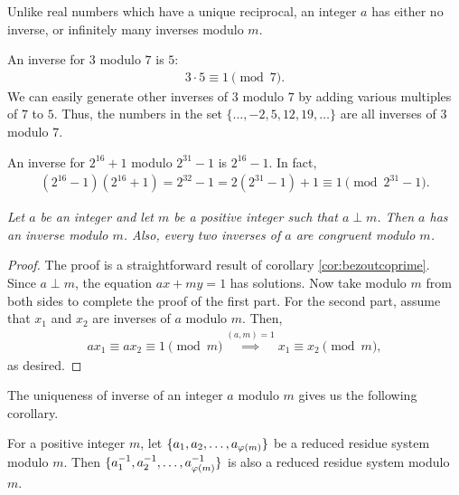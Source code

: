 \documentclass{subfile}
\begin{document}
	\begin{note}
		Unlike real numbers which have a unique reciprocal, an integer $a$ has either no inverse, or infinitely many inverses modulo $m$.
	\end{note}
	
	\begin{example}
		An inverse for $3$ modulo $7$ is $5$:
			\begin{align*}
				3 \cdot 5 \equiv 1 \pmod 7.
			\end{align*}
		We can easily generate other inverses of $3$ modulo $7$ by adding various multiples of $7$ to $5$. Thus, the numbers in the set $\{\ldots, -2, 5, 12, 19, \ldots \}$ are all inverses of $3$ modulo $7$.
	\end{example}
	
	\begin{example}
		An inverse for $2^{16}+1$ modulo $2^{31}-1$ is $2^{16}-1$. In fact,
			\begin{align*}
				(2^{16} - 1)(2^{16} + 1) = 2^{32} -1 = 2(2^{31} - 1) + 1 \equiv 1 \pmod{2^{31} - 1}.
			\end{align*}
	\end{example}
	
	
	\begin{theorem} \label{thm:arithinverse} \slshape
		Let $a$ be an integer and let $m$ be a positive integer such that $a \perp m$. Then $a$ has an inverse modulo $m$. Also, every two inverses of $a$ are congruent modulo $m$.
	\end{theorem}
	
	\begin{proof}
		The proof is a straightforward result of corollary \eqref{cor:bezoutcoprime}. Since $a \perp m$, the equation $ax+my=1$ has solutions. Now take modulo $m$ from both sides to complete the proof of the first part. For the second part, assume that $x_1$ and $x_2$ are inverses of $a$ modulo $m$. Then,
		\begin{align*}
		ax_1 \equiv ax_2 \equiv 1 \pmod m \stackrel{(a,m)=1}{\implies} x_1 \equiv x_2 \pmod m,
		\end{align*}
		as desired.
	\end{proof}
	
The uniqueness of inverse of an integer $a$ modulo $m$ gives us the following corollary.

	\begin{corollary}
		For a positive integer $m$, let $\{a_{1}, a_{2}, \ldots, a_{\varphi(m)}\}$ be a reduced residue system modulo $m$. Then $\{a_{1}^{-1}, a_{2}^{-1}, \ldots, a_{\varphi(m)}^{-1}\}$ is also a reduced residue system modulo $m$.
	\end{corollary}
	
\end{document}
